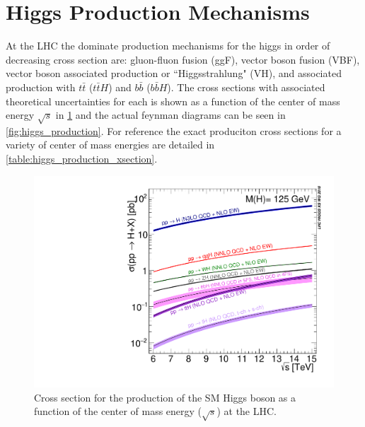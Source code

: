 \section{Higgs Production Mechanisms} \label{sec:higgs:production}

At the LHC the dominate production mechanisms for the higgs in order of
decreasing cross section are: gluon-fluon fusion (ggF), vector boson fusion
(VBF), vector boson associated production or ``Higgsstrahlung" (VH), and
associated production with $t\bar{t}$ ($t\bar{t}H$) and $b\bar{b}$
($b\bar{b}H$).  The cross sections with associated theoretical uncertainties for
each is shown as a function of the center of mass energy $\sqrt{s}$ in
\cref{fig:higgs_xsection} and the actual feynman diagrams can be seen in
\cref{fig:higgs_production}.  For reference the exact produciton cross sections
for a variety of center of mass energies are detailed in \cref{table:higgs_production_xsection}.

\begin{figure}[!htbp]
  \begin{center}
    \includegraphics[width=0.5\linewidth]{figures/higgs/higgs_xsection.pdf}
    \caption{ Cross section for the production of the SM Higgs boson as a
function of the center of mass energy ($\sqrt{s}$) at the LHC. \cite{PDG2018:Ch11}}
    \label{fig:higgs_xsection}
  \end{center}
\end{figure}

